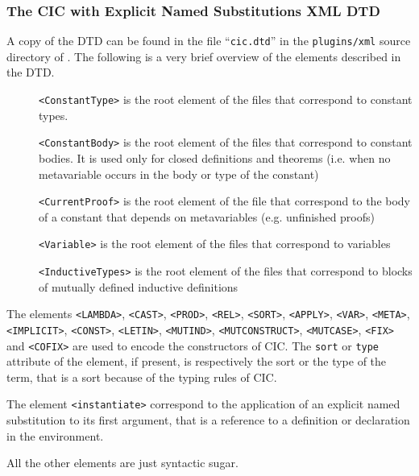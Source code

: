 \subsubsection{The CIC with Explicit Named Substitutions XML DTD}
 
A copy of the DTD can be found in the file ``\verb+cic.dtd+'' in the
\verb+plugins/xml+ source directory of \Coq.
The following is a very brief overview of the elements described in the DTD.
 
\begin{description}
 \item[]\texttt{<ConstantType>}
   is the root element of the files that correspond to constant types.
 \item[]\texttt{<ConstantBody>}
   is the root element of the files that correspond to constant bodies.
   It is used only for closed definitions and theorems (i.e. when no
   metavariable occurs in the body or type of the constant)
 \item[]\texttt{<CurrentProof>}
   is the root element of the file that correspond to the body of a constant
   that depends on metavariables (e.g. unfinished proofs)
 \item[]\texttt{<Variable>}
   is the root element of the files that correspond to variables
 \item[]\texttt{<InductiveTypes>}
   is the root element of the files that correspond to blocks
   of mutually defined inductive definitions
\end{description}
 
The elements
 \verb+<LAMBDA>+, \verb+<CAST>+, \verb+<PROD>+, \verb+<REL>+, \verb+<SORT>+,
 \verb+<APPLY>+, \verb+<VAR>+, \verb+<META>+, \verb+<IMPLICIT>+, \verb+<CONST>+, \verb+<LETIN>+, \verb+<MUTIND>+, \verb+<MUTCONSTRUCT>+, \verb+<MUTCASE>+,
 \verb+<FIX>+ and \verb+<COFIX>+ are used to encode the constructors of CIC.
 The \verb+sort+ or \verb+type+ attribute of the element, if present, is
 respectively the sort or the type of the term, that is a sort because of the
 typing rules of CIC.
 
The element \verb+<instantiate>+ correspond to the application of an explicit
named substitution to its first argument, that is a reference to a definition
or declaration in the environment.
 
All the other elements are just syntactic sugar.


